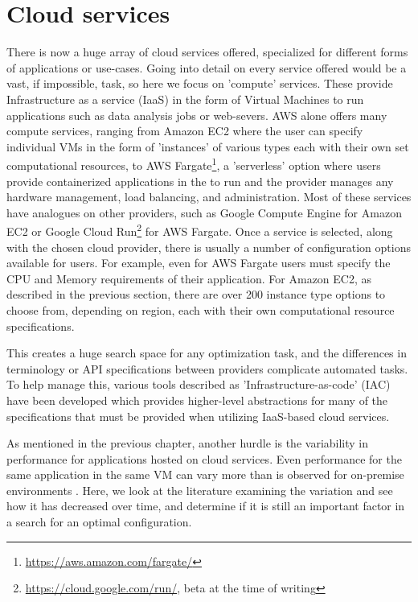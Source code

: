 \documentclass{report}
\begin{document}
\section{Cloud services}
There is now a huge array of cloud services offered, specialized for different forms of applications or use-cases. Going into detail on every service offered would be a vast, if impossible, task, so here we focus on 'compute' services. These provide Infrastructure as a service (IaaS) in the form of Virtual Machines to run applications such as data analysis jobs or web-severs. AWS alone offers many compute services, ranging from Amazon EC2 where the user can specify individual VMs in the form of 'instances' of various types each with their own set computational resources, to AWS Fargate\footnote{\url{https://aws.amazon.com/fargate/}}, a 'serverless' option where users provide containerized applications in the to run and the provider manages any hardware management, load balancing, and administration. Most of these services have analogues on other providers, such as Google Compute Engine for Amazon EC2 or Google Cloud Run\footnote{\url{https://cloud.google.com/run/}, beta at the time of writing} for AWS Fargate. Once a service is selected, along with the chosen cloud provider, there is usually a number of configuration options available for users. For example, even for AWS Fargate users must specify the CPU and Memory requirements of their application. For Amazon EC2, as described in the previous section, there are over 200 instance type options to choose from, depending on region, each with their own computational resource specifications.

This creates a huge search space for any optimization task, and the differences in terminology or API specifications between providers complicate automated tasks. To help manage this, various tools described as 'Infrastructure-as-code' (IAC) have been developed which provides higher-level abstractions for many of the specifications that must be provided when utilizing IaaS-based cloud services. 

As mentioned in the previous chapter, another hurdle is the variability in performance for applications hosted on cloud services. Even performance for the same application in the same VM can vary more than is observed for on-premise environments \cite{Leitner2014}. Here, we look at the literature examining the variation and see how it has decreased over time, and determine if it is still an important factor in a search for an optimal configuration.
\end{document}
